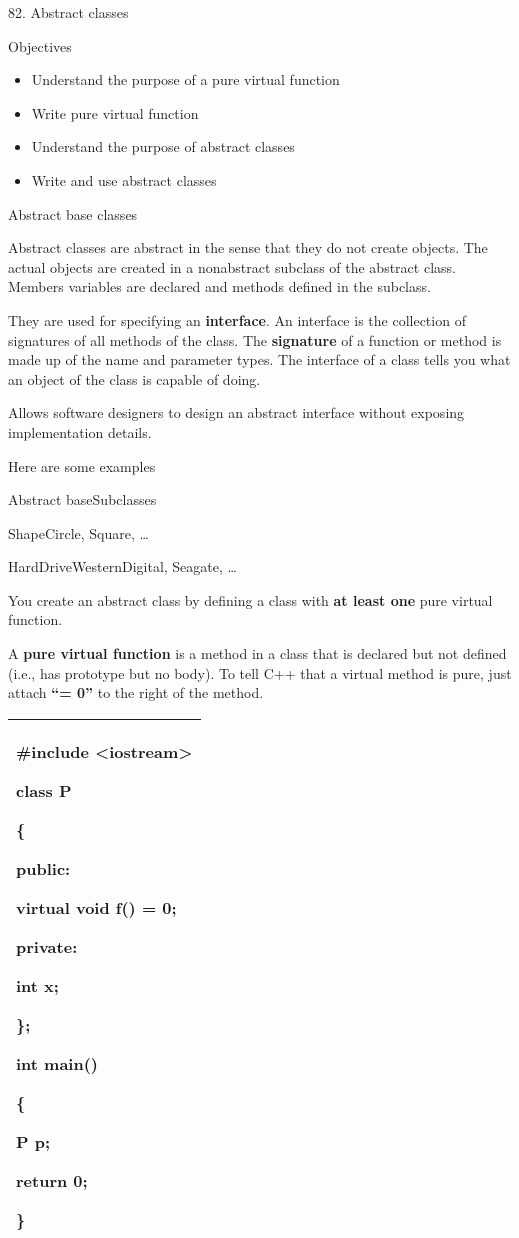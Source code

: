 \documentclass[
]{article}
\author{}
\date{}
\providecommand{\tightlist}{%
  \setlength{\itemsep}{0pt}\setlength{\parskip}{0pt}}
\begin{document}
82. Abstract classes

Objectives

\begin{itemize}
\tightlist
\item
  Understand the purpose of a pure virtual function
\item
  Write pure virtual function
\item
  Understand the purpose of abstract classes
\item
  Write and use abstract classes
\end{itemize}

Abstract base classes

Abstract classes are abstract in the sense that they do not create
objects. The actual objects are created in a nonabstract subclass of the
abstract class. Members variables are declared and methods defined in
the subclass.

They are used for specifying an \textbf{interface}. An interface is the
collection of signatures of all methods of the class. The
\textbf{signature} of a function or method is made up of the name and
parameter types. The interface of a class tells you what an object of
the class is capable of doing.

Allows software designers to design an abstract interface without
exposing implementation details.

Here are some examples

Abstract baseSubclasses

ShapeCircle, Square, \ldots{}

HardDriveWesternDigital, Seagate, \ldots{}

You create an abstract class by defining a class with \textbf{at least
one} pure virtual function.

A \textbf{pure virtual function} is a method in a class that is declared
but not defined (i.e., has prototype but no body). To tell C++ that a
virtual method is pure, just attach \textbf{``= 0''} to the right of the
method.

\begin{longtable}[]{@{}l@{}}
\toprule
\endhead
\begin{minipage}[t]{0.97\columnwidth}\raggedright
\#include \textless iostream\textgreater{}

class P

\{

public:

\textbf{virtual} void f() \textbf{= 0};

private:

\textbf{}int x;

\};

int main()

\{

P p;

return 0;

\}\strut
\end{minipage}\tabularnewline
\bottomrule
\end{longtable}
\end{document}
